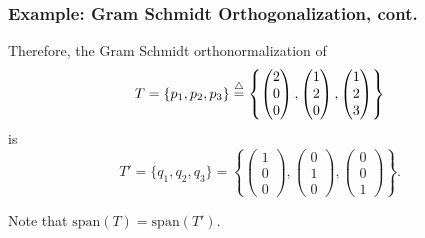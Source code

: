 \documentclass{beamer}
\begin{document}
\begin{frame}\frametitle{Example: Gram Schmidt Orthogonalization, cont.}

Therefore, the Gram Schmidt orthonormalization of 
\[
T = \{ p_1, p_2, p_3 \} \stackrel{\triangle}{=} \left\{ \begin{pmatrix} 2 \\ 0 \\ 0 \end{pmatrix}, \begin{pmatrix}1 \\ 2 \\ 0 \end{pmatrix}, \begin{pmatrix} 1 \\ 2 \\ 3 \end{pmatrix} \right\}
\]	
is
\[
T' = \{q_1, q_2, q_3\} = \left\{ \begin{pmatrix} 1 \\ 0 \\ 0 \end{pmatrix}, \begin{pmatrix}0 \\ 1 \\ 0 \end{pmatrix}, \begin{pmatrix} 0 \\ 0 \\ 1 \end{pmatrix} \right\}.
\]

\vfill

Note that $\text{span}(T)=\text{span}(T')$.

\end{frame}
\end{document}
